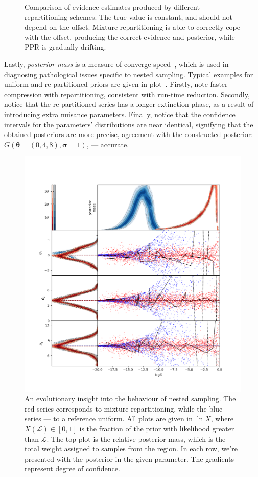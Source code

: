 \documentclass[usenatbib]{mnras}
\begin{document}
\begin{figure}
  
\caption{Comparison of evidence estimates produced by different repartitioning schemes. The true value is constant, and should not depend on the offset. Mixture repartitioning is able to correctly cope with the offset, producing the correct evidence and posterior, while PPR is gradually drifting.\label{fig:drift}}
\end{figure}


Lastly, \emph{posterior mass} is a measure of converge
speed~\cite{higson2018nestcheck}, which is used in diagnosing
pathological issues specific to nested sampling. Typical examples for
uniform and re-partitioned priors are given in
plot~. Firstly, note faster compression with
repartitioning, consistent with run-time reduction. Secondly, notice
that the re-partitioned series has a longer extinction phase, as a
result of introducing extra nuisance parameters. Finally, notice that
the confidence intervals for the parameters' distributions are near
identical, signifying that the obtained posteriors are more precise,
agreement with the constructed posterior:
\(G(\bm{\theta} = (0, 4, 8), \bm{\sigma} = 1)\), --- accurate.

\begin{figure}
\includegraphics[width=.5\textwidth]{./illustrations/higson.png}
\caption{An evolutionary insight into the behaviour of nested sampling. The \color{red} red \color{black} series corresponds to mixture repartitioning, while the \color{blue} blue \color{black} series --- to a reference uniform. All plots are given in \(\ln X\), where \(X(\mathcal{L}) \in [0,1]\) is the fraction of the prior with likelihood greater than \(\mathcal{L}\). The top plot is the relative posterior mass, which is the total weight assigned to samples from the region. In each row, we're presented with the posterior in the given parameter. The gradients represent degree of confidence.\label{fig:higson}}
\end{figure}
\end{document}
